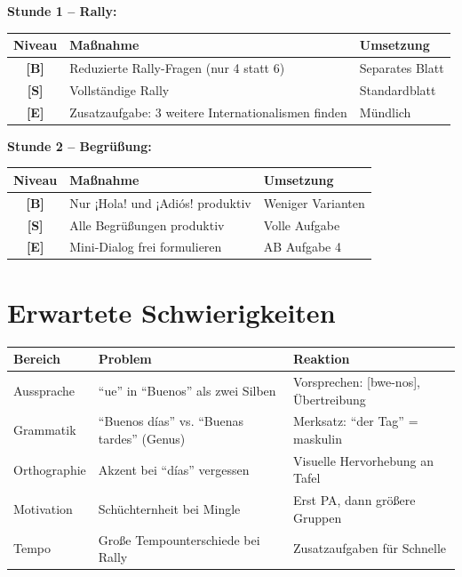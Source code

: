 \documentclass[11pt,a4paper]{article}
\newcommand{\basis}{\textcolor{basis}{\textbf{[B]}}}
\newcommand{\standard}{\textcolor{standard}{\textbf{[S]}}}
\newcommand{\erweiterung}{\textcolor{erweiterung}{\textbf{[E]}}}
\begin{document}
\begin{diffbox}

\textbf{Stunde 1 -- Rally:}

\begin{tabularx}{\textwidth}{|c|X|X|}
\hline
\textbf{Niveau} & \textbf{Maßnahme} & \textbf{Umsetzung} \\
\hline
\basis & Reduzierte Rally-Fragen (nur 4 statt 6) & Separates Blatt \\
\hline
\standard & Vollständige Rally & Standardblatt \\
\hline
\erweiterung & Zusatzaufgabe: 3 weitere Internationalismen finden & Mündlich \\
\hline
\end{tabularx}

\vspace{1em}

\textbf{Stunde 2 -- Begrüßung:}

\begin{tabularx}{\textwidth}{|c|X|X|}
\hline
\textbf{Niveau} & \textbf{Maßnahme} & \textbf{Umsetzung} \\
\hline
\basis & Nur ¡Hola! und ¡Adiós! produktiv & Weniger Varianten \\
\hline
\standard & Alle Begrüßungen produktiv & Volle Aufgabe \\
\hline
\erweiterung & Mini-Dialog frei formulieren & AB Aufgabe 4 \\
\hline
\end{tabularx}

\end{diffbox}

\vspace{1em}

\section*{Erwartete Schwierigkeiten}

\begin{tabularx}{\textwidth}{|l|X|X|}
\hline
\textbf{Bereich} & \textbf{Problem} & \textbf{Reaktion} \\
\hline
Aussprache & ``ue'' in ``Buenos'' als zwei Silben & Vorsprechen: [bwe-nos], Übertreibung \\
\hline
Grammatik & ``Buenos días'' vs. ``Buenas tardes'' (Genus) & Merksatz: ``der Tag'' = maskulin \\
\hline
Orthographie & Akzent bei ``días'' vergessen & Visuelle Hervorhebung an Tafel \\
\hline
Motivation & Schüchternheit bei Mingle & Erst PA, dann größere Gruppen \\
\hline
Tempo & Große Tempounterschiede bei Rally & Zusatzaufgaben für Schnelle \\
\hline
\end{tabularx}
\end{document}
